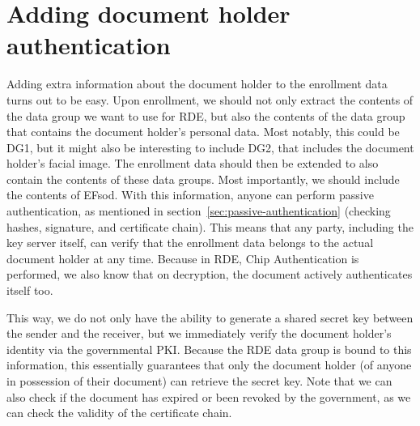 \section{Adding document holder authentication}\label{sec:adding-document-holder-authentication}
Adding extra information about the document holder to the enrollment data turns out to be easy.
Upon enrollment, we should not only extract the contents of the data group we want to use for RDE, but also the contents of the data group that contains the document holder's personal data.
Most notably, this could be DG1, but it might also be interesting to include DG2, that includes the document holder's facial image.
The enrollment data should then be extended to also contain the contents of these data groups.
Most importantly, we should include the contents of EFsod.
With this information, anyone can perform passive authentication, as mentioned in section~\ref{sec:passive-authentication} (checking hashes, signature, and certificate chain).
This means that any party, including the key server itself, can verify that the enrollment data belongs to the actual document holder at any time.
Because in RDE, Chip Authentication is performed, we also know that on decryption, the document actively authenticates itself too.

This way, we do not only have the ability to generate a shared secret key between the sender and the receiver, but we immediately verify the document holder's identity via the governmental PKI.
Because the RDE data group is bound to this information, this essentially guarantees that only the document holder (of anyone in possession of their document) can retrieve the secret key.
Note that we can also check if the document has expired or been revoked by the government, as we can check the validity of the certificate chain.

